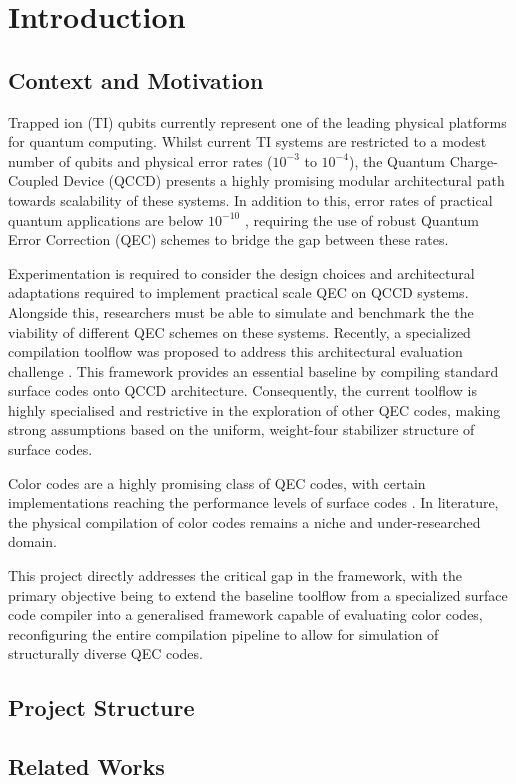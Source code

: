 \chapter{Introduction}



\section{Context and Motivation}

Trapped ion (TI) qubits currently represent one of the leading physical platforms for quantum computing. Whilst current TI systems are restricted to a modest number of qubits and physical error rates ($10^{-3}$ to $10^{-4}$)\cite{quantinuum_performance_validation, quantinuumH2fidelity}, the Quantum Charge-Coupled Device (QCCD) presents a highly promising modular architectural path towards scalability of these systems. 
In addition to this, error rates of practical quantum applications are below $10^{-10}$ \cite{google2024}, requiring the use of robust Quantum Error Correction (QEC) schemes to bridge the gap between these rates. 

Experimentation is required to consider the design choices and architectural adaptations required to implement practical scale QEC on QCCD systems. Alongside this, researchers must be able to simulate and benchmark the the viability of different QEC schemes on these systems. Recently, a specialized compilation toolflow was proposed to address this architectural evaluation challenge \cite{scottPaper}. This framework provides an essential baseline by compiling standard surface codes onto QCCD architecture. 
Consequently, the current toolflow is highly specialised and restrictive in the exploration of other QEC codes, making strong assumptions based on the uniform, weight-four stabilizer structure of surface codes.

Color codes are a highly promising class of QEC codes, with certain implementations reaching the performance levels of surface codes \cite{vibedecoder}. In literature, the physical compilation of color codes remains a niche and under-researched domain. 

This project directly addresses the critical gap in the framework, with the primary objective being to extend the baseline toolflow from a specialized surface code compiler into a generalised framework capable of evaluating color codes, reconfiguring the entire compilation pipeline to allow for simulation of structurally diverse QEC codes.

\section{Project Structure}


\section{Related Works}


